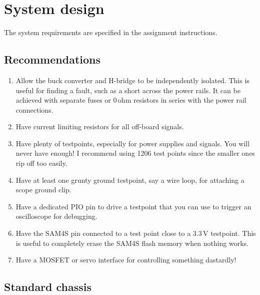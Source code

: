 \chapter{System design}
\label{hardware}

The system requirements are specified in the assignment instructions.


\section{Recommendations}\label{recommendations}

\begin{enumerate}
\item
  Allow the buck converter and H-bridge to be independently isolated.
  This is useful for finding a fault, such as a short across the power
  rails.  It can be achieved with separate fuses or 0\,ohm resistors
  in series with the power rail connections.


\item
  Have current limiting resistors for all off-board signals.

\item
  Have plenty of testpoints, especially for power supplies and
  signals.  You will never have enough!  I recommend using 1206 test
  points since the smaller ones rip off too easily.

\item
  Have at least one grunty ground testpoint, say a wire loop, for
  attaching a scope ground clip.

\item
  Have a dedicated PIO pin to drive a testpoint that you can use to
  trigger an oscilloscope for debugging.

\item
  Have the SAM4S  pin connected to a test point close to a 3.3\,V
  testpoint. This is useful to completely erase the SAM4S flash memory
  when nothing works.

\item
  Have a MOSFET or servo interface for controlling something dastardly!

\end{enumerate}


\section{Standard chassis}

